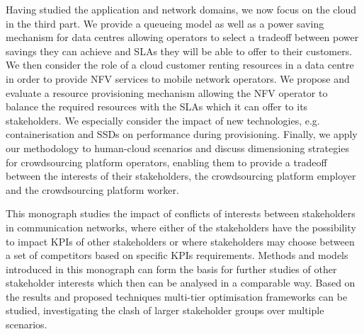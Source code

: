 Having studied the application and network domains, we now focus on the cloud in the third part.
We provide a queueing model as well as a power saving mechanism for data centres allowing operators to select a tradeoff between power savings they can achieve and \glspl{SLA} they will be able to offer to their customers.
We then consider the role of a cloud customer renting resources in a data centre in order to provide \gls{NFV} services to mobile network operators.
We propose and evaluate a resource provisioning mechanism allowing the \gls{NFV} operator to balance the required resources with the \glspl{SLA} which it can offer to its stakeholders.
We especially consider the impact of new technologies, e.g. containerisation and \glspl{SSD} on performance during provisioning.
Finally, we apply our methodology to human-cloud scenarios and discuss dimensioning strategies for crowdsourcing platform operators, enabling them to provide a tradeoff between the interests of their stakeholders, the crowdsourcing platform employer and the crowdsourcing platform worker.

This monograph studies the impact of conflicts of interests between stakeholders in communication networks, where either of the stakeholders have the possibility to impact \glspl{KPI} of other stakeholders or where stakeholders may choose between a set of competitors based on specific \glspl{KPI} requirements.
Methods and models introduced in this monograph can form the basis for further studies of other stakeholder interests which then can be analysed in a comparable way.
Based on the results and proposed techniques multi-tier optimisation frameworks can be studied, investigating the clash of larger stakeholder groups over multiple scenarios.

